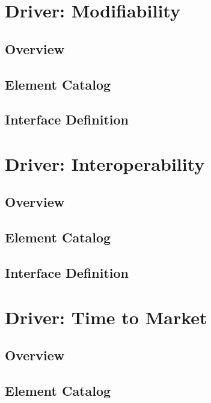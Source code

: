 \documentclass[11pt,letterpaper]{article}
\begin{document}


\section{Driver: Modifiability}

\subsection{Overview}

\subsection{Element Catalog}
\subsection{Interface Definition}



\section{Driver: Interoperability}

\subsection{Overview}
\subsection{Element Catalog}
\subsection{Interface Definition}


\section{Driver: Time to Market}

\subsection{Overview}
\subsection{Element Catalog}
\end{document}
